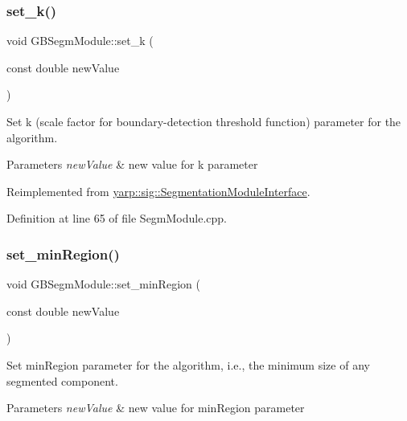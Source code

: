 \subsubsection{\texorpdfstring{set\_k()}{set\_k()}}
{\footnotesize\ttfamily void G\+B\+Segm\+Module\+::set\+\_\+k (\begin{DoxyParamCaption}\item[{const double}]{new\+Value }\end{DoxyParamCaption})\hspace{0.3cm}{\ttfamily [virtual]}}



Set k (scale factor for boundary-\/detection threshold function) parameter for the algorithm. 


\begin{DoxyParams}{Parameters}
{\em new\+Value} & new value for k parameter \\
\hline
\end{DoxyParams}


Reimplemented from \mbox{\hyperlink{classyarp_1_1sig_1_1SegmentationModuleInterface_a2851eae0226ad68f41cd8b61d8bb1456}{yarp\+::sig\+::\+Segmentation\+Module\+Interface}}.



Definition at line 65 of file Segm\+Module.\+cpp.


\begin{DoxyCode}{0}

\end{DoxyCode}
\mbox{\label{classGBSegmModule_ae1c722c9c774cbde4f6bfada3f0826ba}} 
\subsubsection{\texorpdfstring{set\_minRegion()}{set\_minRegion()}}
{\footnotesize\ttfamily void G\+B\+Segm\+Module\+::set\+\_\+min\+Region (\begin{DoxyParamCaption}\item[{const double}]{new\+Value }\end{DoxyParamCaption})\hspace{0.3cm}{\ttfamily [virtual]}}



Set min\+Region parameter for the algorithm, i.\+e., the minimum size of any segmented component. 


\begin{DoxyParams}{Parameters}
{\em new\+Value} & new value for min\+Region parameter \\
\hline
\end{DoxyParams}


